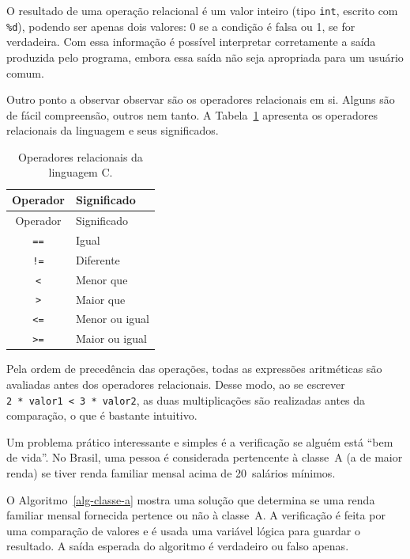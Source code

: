 \documentclass[
  11pt,
  a4paper,
]{scrbook}
\begin{document}
O resultado de uma operação relacional é um valor inteiro (tipo
\texttt{int}, escrito com \texttt{\%d}), podendo ser apenas dois
valores: 0 se a condição é falsa ou 1, se for verdadeira. Com essa
informação é possível interpretar corretamente a saída produzida pelo
programa, embora essa saída não seja apropriada para um usuário comum.

Outro ponto a observar observar são os operadores relacionais em si.
Alguns são de fácil compreensão, outros nem tanto. A
Tabela~\ref{tbl-operadores-relacionais} apresenta os operadores
relacionais da linguagem e seus significados.

\begin{longtable}[]{@{}cl@{}}
\caption{Operadores relacionais da linguagem
C.}\label{tbl-operadores-relacionais}\tabularnewline
\toprule\noalign{}
Operador & Significado \\
\midrule\noalign{}
\endfirsthead
\toprule\noalign{}
Operador & Significado \\
\midrule\noalign{}
\endhead
\bottomrule\noalign{}
\endlastfoot
\texttt{==} & Igual \\
\texttt{!=} & Diferente \\
\texttt{\textless{}} & Menor que \\
\texttt{\textgreater{}} & Maior que \\
\texttt{\textless{}=} & Menor ou igual \\
\texttt{\textgreater{}=} & Maior ou igual \\
\end{longtable}

Pela ordem de precedência das operações, todas as expressões aritméticas
são avaliadas antes dos operadores relacionais. Desse modo, ao se
escrever \texttt{2\ *\ valor1\ \textless{}\ 3\ *\ valor2}, as duas
multiplicações são realizadas antes da comparação, o que é bastante
intuitivo.

Um problema prático interessante e simples é a verificação se alguém
está ``bem de vida''. No Brasil, uma pessoa é considerada pertencente à
classe~A (a de maior renda) se tiver renda familiar mensal acima de
20~salários mínimos.

O Algoritmo~\ref{alg-classe-a} mostra uma solução que determina se uma
renda familiar mensal fornecida pertence ou não à classe~A. A
verificação é feita por uma comparação de valores e é usada uma variável
lógica para guardar o resultado. A saída esperada do algoritmo é
verdadeiro ou falso apenas.
\end{document}
